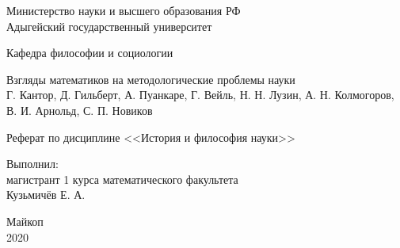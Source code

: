 \begin{center}
Министерство науки и высшего образования РФ \\
Адыгейский государственный университет
\end{center}

\vspace{8em}

\begin{center}
\Large Кафедра философии и социологии \\ 
\end{center}

\vspace{2em}

\begin{center}
\Large Взгляды математиков на методологические проблемы науки \\
\large Г. Кантор, Д. Гильберт, А. Пуанкаре, Г. Вейль, Н. Н. Лузин, А. Н. Колмогоров, В. И. Арнольд, С. П. Новиков
\vspace{1em}

\small
Реферат по дисциплине <<История и философия науки>>
\end{center}

\vspace{6em}

\begin{flushright}
Выполнил: \\
магистрант 1 курса математического факультета \\
Кузьмичёв Е. А.
\end{flushright}


\vspace{\fill}

\begin{center}
Майкоп \\ 2020
\end{center}

\thispagestyle{empty}
